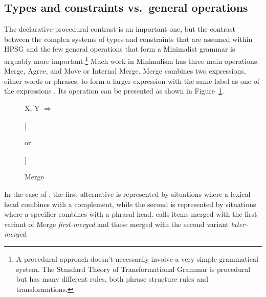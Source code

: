 \documentclass[output=paper
 	        ,biblatex
                ,babelshorthands
                ,newtxmath
                ,draftmode
                ,colorlinks, citecolor=brown
]{langscibook}
\begin{document}


\subsection{Types and constraints vs.\ general operations}
\label{sec-types-vs-operations}

The declarative-procedural contrast is an important one, but the contrast between the complex
systems of types and constraints that are assumed within HPSG and the few general operations that
form a Minimalist grammar is arguably more important.\footnote{%
  A procedural approach doesn't necessarily involve a very simple grammatical system. The Standard
  Theory of Transformational Grammar \citep{Chomsky65a} is procedural but has many different rules,
  both phrase structure rules and transformations.}
Much work in Minimalism has three main operations: Merge, Agree, and Move or Internal Merge. Merge
combines two expressions, either words or phrases, to form a larger expression with the same label
as one of the expressions \parencites[244]{Chomsky95a-u}[]{Chomsky2008a}. Its operation can be presented as shown in Figure~\ref{fig:min-merge}.
\begin{figure}
\centering
	X, Y $\Rightarrow$
	\hspace{1em}
	\begin{forest} %
		[X [X,baseline] [Y]]
	\end{forest}
\hspace{1em}
{or}
\hspace{1em}
	\begin{forest} %
		[Y [X,baseline] [Y]]
	\end{forest}
	\caption{\label{fig:min-merge}Merge}
\end{figure}
In the case of , the first alternative is represented by situations where a lexical head
combines with a complement, while the second is represented by situations where a specifier combines
with a phrasal head. \citet[]{Chomsky2008a} calls items merged with the first variant of Merge \emph{first-merged}
and those merged with the second variant \emph{later-merged}.
\end{document}
